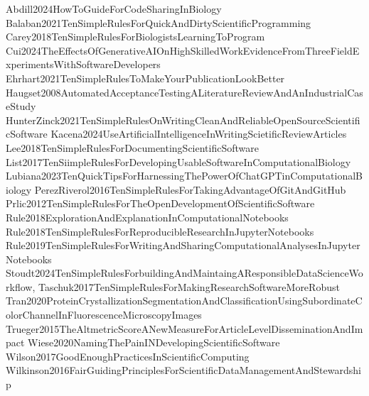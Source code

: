\tiem Abdill2024HowToGuideForCodeSharingInBiology
\tiem Balaban2021TenSimpleRulesForQuickAndDirtyScientificProgramming
\tiem Carey2018TenSimpleRulesForBiologistsLearningToProgram
\tiem Cui2024TheEffectsOfGenerativeAIOnHighSkilledWorkEvidenceFromThreeFieldExperimentsWithSoftwareDevelopers
\tiem Ehrhart2021TenSimpleRulesToMakeYourPublicationLookBetter
\tiem Haugset2008AutomatedAcceptanceTestingALiteratureReviewAndAnIndustrialCaseStudy
\tiem HunterZinck2021TenSimpleRulesOnWritingCleanAndReliableOpenSourceScientificSoftware
\tiem Kacena2024UseArtificialIntelligenceInWritingScietificReviewArticles
\tiem Lee2018TenSimpleRulesForDocumentingScientificSoftware
\tiem List2017TenSiimpleRulesForDevelopingUsableSoftwareInComputationalBiology
\tiem Lubiana2023TenQuickTipsForHarnessingThePowerOfChatGPTinComputationalBiology
\tiem PerezRiverol2016TenSimpleRulesForTakingAdvantageOfGitAndGitHub
\tiem Prlic2012TenSimpleRulesForTheOpenDevelopmentOfScientificSoftware
\tiem Rule2018ExplorationAndExplanationInComputationalNotebooks
\tiem Rule2018TenSimpleRulesForReproducibleResearchInJupyterNotebooks
\tiem Rule2019TenSimpleRulesForWritingAndSharingComputationalAnalysesInJupyterNotebooks
\tiem Stoudt2024TenSimpleRulesForbuildingAndMaintaingAResponsibleDataScienceWorkflow,
\tiem Taschuk2017TenSimpleRulesForMakingResearchSoftwareMoreRobust
\tiem Tran2020ProteinCrystallizationSegmentationAndClassificationUsingSubordinateColorChannelInFluorescenceMicroscopyImages
\tiem Trueger2015TheAltmetricScoreANewMeasureForArticleLevelDisseminationAndImpact
\tiem Wiese2020NamingThePainINDevelopingScientificSoftware
\tiem Wilson2017GoodEnoughPracticesInScientificComputing
\tiem Wilkinson2016FairGuidingPrinciplesForScientificDataManagementAndStewardship
